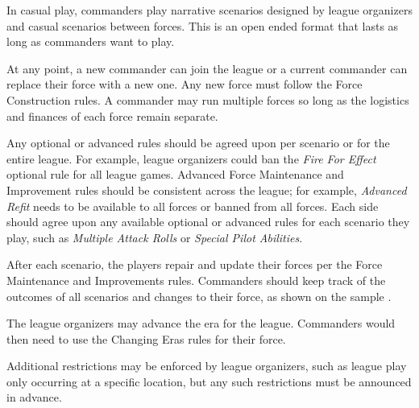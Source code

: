 In casual play, commanders play narrative scenarios designed by league organizers and casual scenarios between forces.
This is an open ended format that lasts as long as commanders want to play.

At any point, a new commander can join the league or a current commander can replace their force with a new one.
Any new force must follow the Force Construction rules.
A commander may run multiple forces so long as the logistics and finances of each force remain separate.

Any optional or advanced rules should be agreed upon per scenario or for the entire league.
For example, league organizers could ban the \emph{Fire For Effect} optional rule for all league games.
Advanced Force Maintenance and Improvement rules should be consistent across the league; for example, \emph{Advanced Refit} needs to be available to all forces or banned from all forces.
Each side should agree upon any available optional or advanced rules for each scenario they play, such as \emph{Multiple Attack Rolls} or \emph{Special Pilot Abilities}.

After each scenario, the players repair and update their forces per the Force Maintenance and Improvements rules.
Commanders should keep track of the outcomes of all scenarios and changes to their force, as shown on the sample .

The league organizers may advance the era for the league.
Commanders would then need to use the Changing Eras rules for their force.

Additional restrictions may be enforced by league organizers, such as league play only occurring at a specific location, but any such restrictions must be announced in advance.
